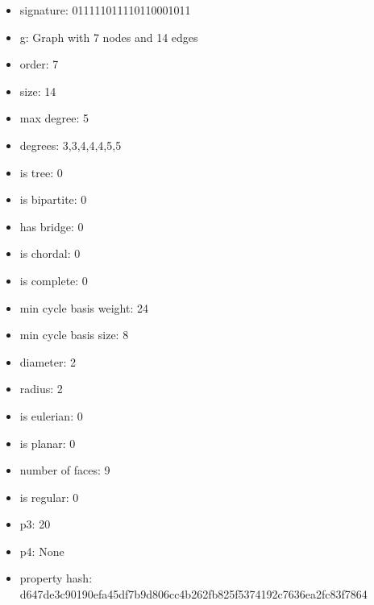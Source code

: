 \begin{itemize}
\item signature: 011111011110110001011
\item g: Graph with 7 nodes and 14 edges
\item order: 7
\item size: 14
\item max degree: 5
\item degrees: 3,3,4,4,4,5,5
\item is tree: 0
\item is bipartite: 0
\item has bridge: 0
\item is chordal: 0
\item is complete: 0
\item min cycle basis weight: 24
\item min cycle basis size: 8
\item diameter: 2
\item radius: 2
\item is eulerian: 0
\item is planar: 0
\item number of faces: 9
\item is regular: 0
\item p3: 20
\item p4: None
\item property hash: d647de3c90190efa45df7b9d806cc4b262fb825f5374192c7636ea2fc83f7864
\end{itemize}
\newpage
\begin{figure}
\end{figure}
